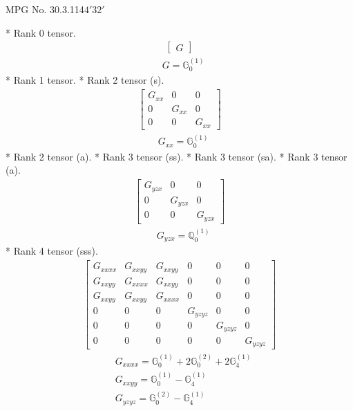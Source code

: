 \documentclass[fleqn,8pt,landscape]{jsarticle}
\begin{document}
\setcounter{MaxMatrixCols}{32}

\renewcommand{\tablename}{Table~}
\renewcommand{\figurename}{Figure~}
\begin{center}
\LARGE
MPG No. 30.3.114\quad$4'32'$
\end{center}
* Rank 0 tensor.
\begin{align*}
\begin{bmatrix} G \end{bmatrix}
\end{align*}
\begin{align*}
& G = \mathbb{G}_{0}^{(1)}
\end{align*}
* Rank 1 tensor.
* Rank 2 tensor (s).
\begin{align*}
\begin{bmatrix} G_{xx} & 0 & 0 \\ 0 & G_{xx} & 0 \\ 0 & 0 & G_{xx} \end{bmatrix}
\end{align*}
\begin{align*}
& G_{xx} = \mathbb{G}_{0}^{(1)}
\end{align*}
* Rank 2 tensor (a).
* Rank 3 tensor (ss).
* Rank 3 tensor (sa).
* Rank 3 tensor (a).
\begin{align*}
\begin{bmatrix} G_{yzx} & 0 & 0 \\ 0 & G_{yzx} & 0 \\ 0 & 0 & G_{yzx} \end{bmatrix}
\end{align*}
\begin{align*}
& G_{yzx} = \mathbb{Q}_{0}^{(1)}
\end{align*}
* Rank 4 tensor (sss).
\begin{align*}
\begin{bmatrix} G_{xxxx} & G_{xxyy} & G_{xxyy} & 0 & 0 & 0 \\ G_{xxyy} & G_{xxxx} & G_{xxyy} & 0 & 0 & 0 \\ G_{xxyy} & G_{xxyy} & G_{xxxx} & 0 & 0 & 0 \\ 0 & 0 & 0 & G_{yzyz} & 0 & 0 \\ 0 & 0 & 0 & 0 & G_{yzyz} & 0 \\ 0 & 0 & 0 & 0 & 0 & G_{yzyz} \end{bmatrix}
\end{align*}
\begin{align*}
& G_{xxxx} = \mathbb{G}_{0}^{(1)} + 2 \mathbb{G}_{0}^{(2)} + 2 \mathbb{G}_{4}^{(1)} \\
& G_{xxyy} = \mathbb{G}_{0}^{(1)} - \mathbb{G}_{4}^{(1)} \\
& G_{yzyz} = \mathbb{G}_{0}^{(2)} - \mathbb{G}_{4}^{(1)}
\end{align*}
\end{document}
